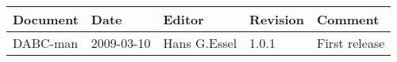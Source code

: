 \begin{table}[h]
\begin{tabular}{|p{2.0cm}|p{2.0cm}|p{3.0cm}|p{1.6cm}|p{5.0cm}|} \hline
Document   & Date        & Editor       & Revision & Comment \\ \hline
DABC-man & 2009-03-10 & Hans G.Essel & 1.0.1      & First release \\ \hline
\end{tabular}
\end{table}
